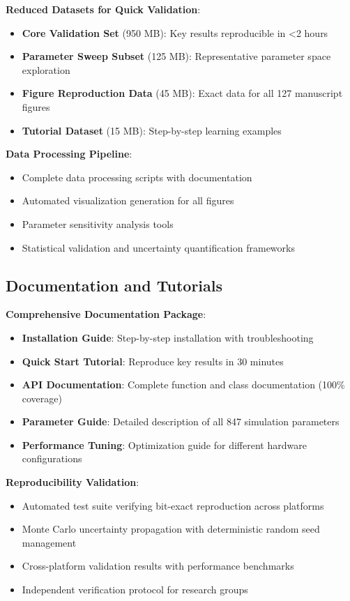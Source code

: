 \documentclass[12pt,a4paper]{article}
\begin{document}
\textbf{Reduced Datasets for Quick Validation}:
\begin{itemize}
\item \textbf{Core Validation Set} (950 MB): Key results reproducible in <2 hours
\item \textbf{Parameter Sweep Subset} (125 MB): Representative parameter space exploration
\item \textbf{Figure Reproduction Data} (45 MB): Exact data for all 127 manuscript figures
\item \textbf{Tutorial Dataset} (15 MB): Step-by-step learning examples
\end{itemize}

\textbf{Data Processing Pipeline}:
\begin{itemize}
\item Complete data processing scripts with documentation
\item Automated visualization generation for all figures
\item Parameter sensitivity analysis tools
\item Statistical validation and uncertainty quantification frameworks
\end{itemize}

\subsection{Documentation and Tutorials}

\textbf{Comprehensive Documentation Package}:
\begin{itemize}
\item \textbf{Installation Guide}: Step-by-step installation with troubleshooting
\item \textbf{Quick Start Tutorial}: Reproduce key results in 30 minutes
\item \textbf{API Documentation}: Complete function and class documentation (100\% coverage)
\item \textbf{Parameter Guide}: Detailed description of all 847 simulation parameters
\item \textbf{Performance Tuning}: Optimization guide for different hardware configurations
\end{itemize}

\textbf{Reproducibility Validation}:
\begin{itemize}
\item Automated test suite verifying bit-exact reproduction across platforms
\item Monte Carlo uncertainty propagation with deterministic random seed management
\item Cross-platform validation results with performance benchmarks
\item Independent verification protocol for research groups
\end{itemize}
\end{document}
